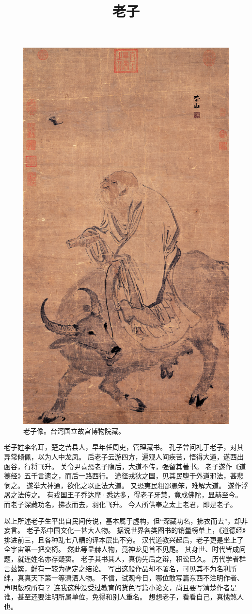 \documentclass[11pt]{article}
\title{老子}
\date{}
\begin{document}
  \maketitle
  
  \begin{figure}[H]
    \centering
    \includegraphics[height=0.7\textwidth]{../Figures/LaoZi.jpg}
    \caption{老子像。台湾国立故宫博物院藏。}
  \end{figure}

  \newpage
  
  \linenumbers

老子姓李名耳，楚之苦县人，早年任周吏，管理藏书。
孔子曾问礼于老子，对其异常倾佩，以为人中龙凤。
后老子云游四方，遍观人间疾苦，悟得大道，遂西出函谷，行将飞升。
关令尹喜恐老子隐后，大道不传，强留其著书。
老子遂作《道德经》五千言遗之，而后一路西行。
途径戎狄之国，见其民堕于外道邪法，甚悲悯之。
遂举大神通，欲化之以正法大道。
又恐夷民粗鄙愚笨，难解大道。
遂作浮屠之法传之。
有戎国王子乔达摩·悉达多，得老子牙慧，竟成佛陀，显赫至今。
而老子深藏功名，拂衣而去，羽化飞升。
今人所供奉之太上老君，即是老子。

\newline

以上所述老子生平出自民间传说，基本属于虚构，但“深藏功名，拂衣而去”，却非妄言。
老子系中国文化一甚大人物。
据说世界各类图书的销量榜单上，《道德经》排进前三，且各种乱七八糟的译本层出不穷。
汉代道教兴起后，老子更是坐上了全宇宙第一把交椅。
然此等显赫人物，竟神龙见首不见尾。
其身世、时代皆成问题，就连姓名亦存疑窦。
老子其书其人，真伪先后之辩，积讼已久。
历代学者群言兹繁，鲜有一较为确定之结论。
写出这般作品却不署名，可见其不为名利所绊，真真天下第一等潇洒人物。
不信，试观今日，哪位敢写篇东西不注明作者、声明版权所有？
连我这种没受过教育的货色写篇小论文，尚且要写清楚作者是谁，甚至还要注明所属单位，免得和别人重名。
想想老子，看看自己，真愧煞人也。
\end{document}
